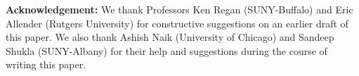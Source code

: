 \documentclass{svproc}
\begin{document}
















\vspace*{.2in}

\noindent
{\bf Acknowledgement:} We thank
Professors Ken Regan (SUNY-Buffalo) and Eric Allender (Rutgers University)
for constructive suggestions on an earlier draft of this paper.
We also thank Ashish Naik (University of Chicago) and 
Sandeep Shukla (SUNY-Albany) for their help and suggestions during the course
of writing this paper.


\newpage


\end{document}

